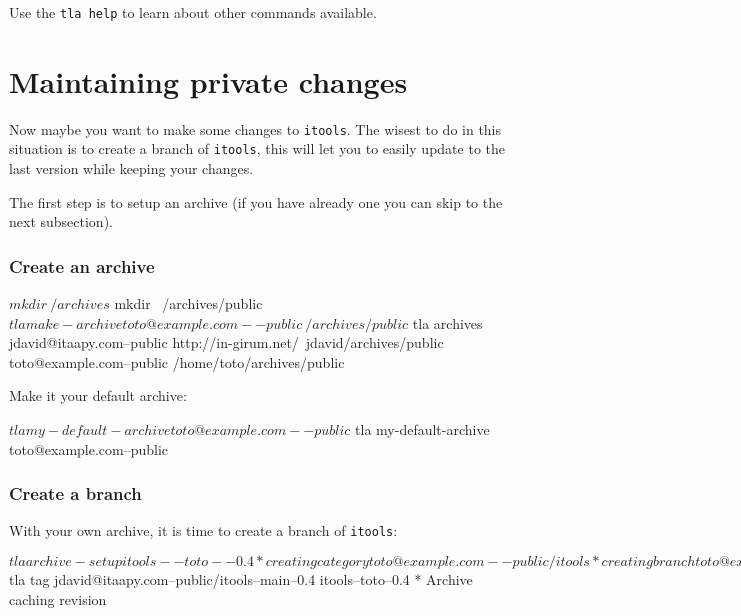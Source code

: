 
Use the {\tt tla help} to learn about other commands available.


\section{Maintaining private changes}

Now maybe you want to make some changes to {\tt itools}. The wisest to do
in this situation is to create a branch of {\tt itools}, this will let you
to easily update to the last version while keeping your changes.

The first step is to setup an archive (if you have already one you can
skip to the next subsection).

\subsubsection{Create an archive}

\begin{code}
    $ mkdir ~/{archives}
    $ mkdir ~/{archives}/public
    $ tla make-archive toto@example.com--public ~/{archives}/public
    $ tla archives
    jdavid@itaapy.com--public
        http://in-girum.net/~jdavid/archives/public
    toto@example.com--public
        /home/toto/{archives}/public
\end{code}

Make it your default archive:

\begin{code}
    $ tla my-default-archive toto@example.com--public
    $ tla my-default-archive
    toto@example.com--public
\end{code}

\subsubsection{Create a branch}

With your own archive, it is time to create a branch of {\tt itools}:

\begin{code}
    $ tla archive-setup itools--toto--0.4
      * creating category toto@example.com--public/itools
      * creating branch toto@example.com--public/itools--toto
      * creating version toto@example.com--public/itools--toto--0.4
    $ tla tag jdavid@itaapy.com--public/itools--main--0.4 itools--toto--0.4
      * Archive caching revision
\end{code}

